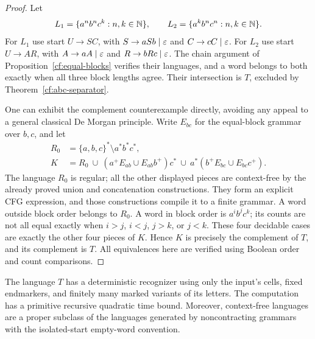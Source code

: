 \begin{proof}
Let
\[
 L_1=\{a^n b^n c^k:n,k\in\mathbb N\},\qquad
 L_2=\{a^k b^n c^n:n,k\in\mathbb N\}.
\]
For $L_1$ use start $U\to SC$, with
$S\to aSb\mid\varepsilon$ and $C\to cC\mid\varepsilon$.
For $L_2$ use start $U\to AR$, with
$A\to aA\mid\varepsilon$ and $R\to bRc\mid\varepsilon$.
The chain argument of Proposition~\ref{cf:equal-blocks} verifies their
languages, and a word belongs to both exactly when all three block
lengths agree.  Their intersection is $T$, excluded by
Theorem~\ref{cf:abc-separator}.

One can exhibit the complement counterexample directly, avoiding any
appeal to a general classical De Morgan principle.  Write $E_{bc}$ for
the equal-block grammar over $b,c$, and let
\begin{align*}
 R_0&=\{a,b,c\}^*\setminus a^*b^*c^*,\\
 K&=R_0\ \cup\ (a^+E_{ab}\cup E_{ab}b^+)c^*
       \ \cup\ a^*(b^+E_{bc}\cup E_{bc}c^+).
\end{align*}
The language $R_0$ is regular; all the other displayed pieces are
context-free by the already proved union and concatenation constructions.
They form an explicit CFG expression, and those constructions compile
it to a finite grammar.  A word outside block order belongs to $R_0$.
A word in block order is $a^i b^j c^k$; its counts are not all equal
exactly when $i>j$, $i<j$, $j>k$, or $j<k$.  These four decidable cases
are exactly the other four pieces of $K$.  Hence $K$ is precisely the
complement of $T$, and its complement is $T$.  All equivalences here
are verified using Boolean order and count comparisons.
\end{proof}

\begin{proposition}
\label{cf:abc-noncontracting}
The language $T$ has a deterministic recognizer using only the input's
cells, fixed endmarkers, and finitely many marked variants of its letters.
The computation has a primitive recursive quadratic time bound.  Moreover,
context-free languages are a proper subclass of the languages generated
by noncontracting grammars with the isolated-start empty-word convention.
\end{proposition}

